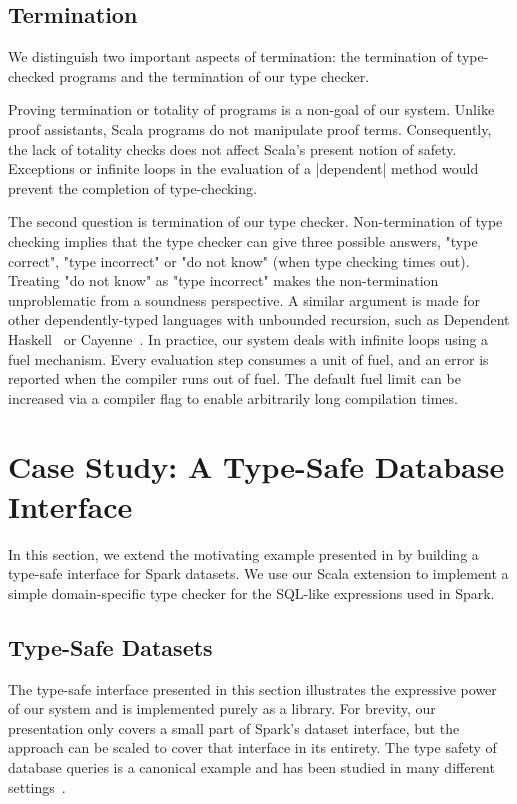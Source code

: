\subsection{Termination}

We distinguish two important aspects of termination: the termination of type-checked programs and the termination of our type checker.

Proving termination or totality of programs is a non-goal of our system.
Unlike proof assistants, Scala programs do not manipulate proof terms.
Consequently, the lack of totality checks does not affect Scala's present notion of safety.
Exceptions or infinite loops in the evaluation of a |dependent| method would prevent the completion of type-checking.

The second question is termination of our type checker.
Non-termination of type checking implies that the type checker can give three possible answers, "type correct", "type incorrect" or "do not know" (when type checking times out).
Treating "do not know" as "type incorrect" makes the non-termination unproblematic from a soundness perspective.
A similar argument is made for other dependently-typed languages with unbounded recursion, such as Dependent Haskell~\citep{eisenberg2016dependent} or Cayenne~\citep{augustsson1998cayenne}.
In practice, our system deals with infinite loops using a fuel mechanism.
Every evaluation step consumes a unit of fuel, and an error is reported when the compiler runs out of fuel.
The default fuel limit can be increased via a compiler flag to enable arbitrarily long compilation times.

\section{Case Study: A Type-Safe Database Interface}
\label{sec:use-case}

In this section, we extend the motivating example presented in  by building a type-safe interface for Spark datasets.
We use our Scala extension to implement a simple domain-specific type checker for the SQL-like expressions used in Spark.

\subsection{Type-Safe Datasets}

The type-safe interface presented in this section illustrates the expressive power of our system and is implemented purely as a library.
For brevity, our presentation only covers a small part of Spark's dataset interface, but the approach can be scaled to cover that interface in its entirety.
The type safety of database queries is a canonical example and has been studied in many different settings~\citep{leijen1999domain, kazerounian2019type, meijer2006linq, chlipala2010ur}.

